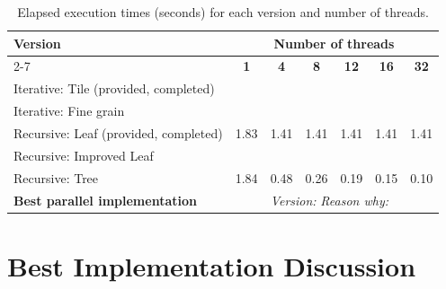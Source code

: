 \documentclass[12pt,a4paper]{report}
\begin{document}
\begin{table}[H]
\centering
\caption{Elapsed execution times (seconds) for each version and number of threads.}
\label{tab:elapsed}
\begin{tabular}{lcccccc}
\toprule
\textbf{Version} & \multicolumn{6}{c}{\textbf{Number of threads}} \\
\cmidrule(lr){2-7}
 & \textbf{1} & \textbf{4} & \textbf{8} & \textbf{12} & \textbf{16} & \textbf{32} \\
\midrule
Iterative: Tile (provided, completed)   & & & & & & \\
Iterative: Fine grain                   & & & & & & \\
Recursive: Leaf (provided, completed)   & 1.83 & 1.41 & 1.41 & 1.41 & 1.41 & 1.41 \\
Recursive: Improved Leaf                & & & & & & \\
Recursive: Tree                         & 1.84 & 0.48 & 0.26 & 0.19 & 0.15 & 0.10 \\
\midrule
\multicolumn{2}{l}{\textbf{Best parallel implementation}} &
\multicolumn{5}{l}{\textit{Version:} \quad \textit{Reason why:}} \\
\bottomrule
\end{tabular}
\end{table}

\section{Best Implementation Discussion}


\end{document}
